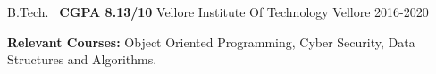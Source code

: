 \begin{cventries}
  \cventry
    { B.Tech. \textbar\ \textbf{CGPA 8.13/10} }
    { Vellore Institute Of Technology }
    { Vellore }
    { 2016-2020 }
    {
      \begin{cvitems}
        \item {\textbf{Relevant Courses:} Object Oriented Programming, Cyber Security, Data Structures and Algorithms.}
      \end{cvitems}
    }
\end{cventries}
